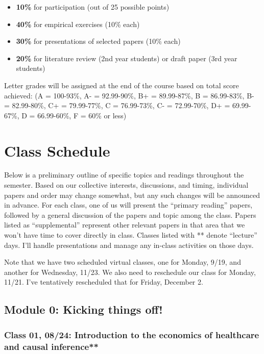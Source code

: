 \documentclass[11pt,]{article}
\begin{document}
\begin{itemize}
\item
  \textbf{10\%} for participation (out of 25 possible points)
\item
  \textbf{40\%} for empirical exercises (10\% each)
\item
  \textbf{30\%} for presentations of selected papers (10\% each)
\item
  \textbf{20\%} for literature review (2nd year students) or draft paper
  (3rd year students)
\end{itemize}

Letter grades will be assigned at the end of the course based on total
score achieved: (A = 100-93\%, A- = 92.99-90\%, B+ = 89.99-87\%, B =
86.99-83\%, B- = 82.99-80\%, C+ = 79.99-77\%, C = 76.99-73\%, C- =
72.99-70\%, D+ = 69.99-67\%, D = 66.99-60\%, F = 60\% or less)

\newpage

\hypertarget{class-schedule}{%
\section{Class Schedule}\label{class-schedule}}

Below is a preliminary outline of specific topics and readings
throughout the semester. Based on our collective interests, discussions,
and timing, individual papers and order may change somewhat, but any
such changes will be announced in advance. For each class, one of us
will present the ``primary reading'' papers, followed by a general
discussion of the papers and topic among the class. Papers listed as
``supplemental'' represent other relevant papers in that area that we
won't have time to cover directly in class. Classes listed with **
denote ``lecture'' days. I'll handle presentations and manage any
in-class activities on those days.

Note that we have two scheduled virtual classes, one for Monday, 9/19,
and another for Wednesday, 11/23. We also need to reschedule our class
for Monday, 11/21. I've tentatively rescheduled that for Friday,
December 2.

\hypertarget{module-0-kicking-things-off}{%
\subsection{Module 0: Kicking things
off!}\label{module-0-kicking-things-off}}

\hypertarget{class-01-0824-introduction-to-the-economics-of-healthcare-and-causal-inference}{%
\subsubsection{Class 01, 08/24: Introduction to the economics of
healthcare and causal
inference**}\label{class-01-0824-introduction-to-the-economics-of-healthcare-and-causal-inference}}
\end{document}
